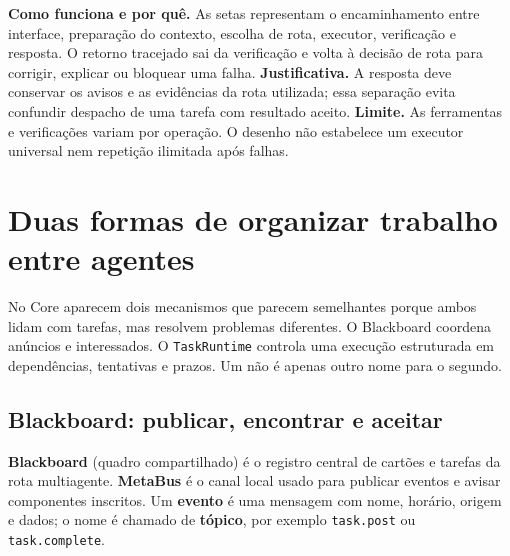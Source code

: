 \begin{descricao}
\textbf{Como funciona e por quê.} As setas representam o encaminhamento entre interface, preparação do contexto, escolha de rota, executor, verificação e resposta. O retorno tracejado sai da verificação e volta à decisão de rota para corrigir, explicar ou bloquear uma falha.
\textbf{Justificativa.} A resposta deve conservar os avisos e as evidências da rota utilizada; essa separação evita confundir despacho de uma tarefa com resultado aceito.
\textbf{Limite.} As ferramentas e verificações variam por operação. O desenho não estabelece um executor universal nem repetição ilimitada após falhas.
\end{descricao}




\section{Duas formas de organizar trabalho entre agentes}

\begin{descricao}
No Core aparecem dois mecanismos que parecem semelhantes porque ambos lidam
com tarefas, mas resolvem problemas diferentes. O Blackboard coordena anúncios
e interessados. O \texttt{TaskRuntime} controla uma execução estruturada em
dependências, tentativas e prazos. Um não é apenas outro nome para o segundo.
\end{descricao}

\subsection{Blackboard: publicar, encontrar e aceitar}

\begin{conceito}
\textbf{Blackboard} (quadro compartilhado) é o registro central de cartões e
tarefas da rota multiagente. \textbf{MetaBus} é o canal local usado para
publicar eventos e avisar componentes inscritos. Um \textbf{evento} é uma
mensagem com nome, horário, origem e dados; o nome é chamado de
\textbf{tópico}, por exemplo \texttt{task.post} ou \texttt{task.complete}.
\end{conceito}

